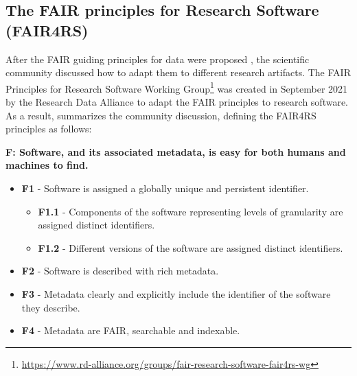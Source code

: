 
\subsection{The FAIR principles for Research Software (FAIR4RS)}
\label{subsec:fair4rs}


After the FAIR guiding principles for data were proposed \cite{wilkinson_fair_2016}, the scientific community discussed how to adapt them to different research artifacts. The FAIR Principles for Research Software Working Group\footnote{\url{https://www.rd-alliance.org/groups/fair-research-software-fair4rs-wg}} was created in September 2021 by the Research Data Alliance to adapt the FAIR principles to research software. As a result, \cite{chue_hong_neil_p_2022_6623556} summarizes the community discussion, defining the FAIR4RS principles as follows:


\textbf{F: Software, and its associated metadata, is easy for both humans and machines to find.}

\begin{itemize}
    \item \textbf{F1} - Software is assigned a globally unique and persistent identifier.
    \begin{itemize}
        \item \textbf{F1.1} - Components of the software representing levels of granularity are assigned distinct identifiers.
        \item \textbf{F1.2} - Different versions of the software are assigned distinct identifiers.
    \end{itemize}

    \item \textbf{F2} - Software is described with rich metadata.
    \item \textbf{F3} - Metadata clearly and explicitly include the identifier of the software they describe.
    \item \textbf{F4} - Metadata are FAIR, searchable and indexable.
\end{itemize}

